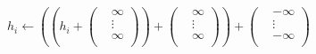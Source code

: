 \begin{align*}
    h_i \leftarrow \left(\left( h_i + 
    \left(\begin{matrix}
    &\infty \\
    &\vdots \\
    &\infty \\
\end{matrix}\right)\right)
    + \left(\begin{matrix}
    &\infty \\
    &\vdots \\
    &\infty \\
\end{matrix}\right)\right)
    + \left(\begin{matrix}
    &-\infty \\
    &\vdots \\
    &-\infty \\
\end{matrix}\right)
\end{align*}

